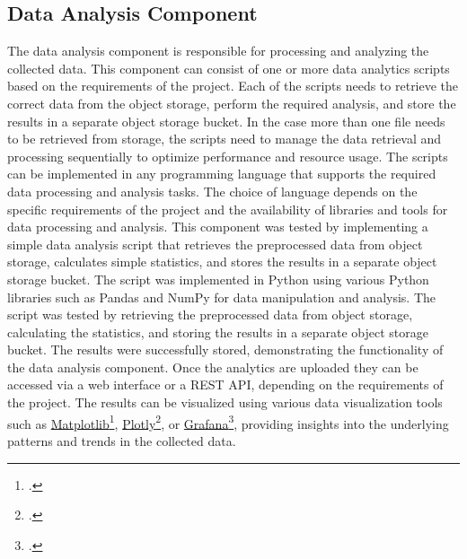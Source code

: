 \subsection{Data Analysis Component}
The data analysis component is responsible for processing and analyzing the collected data. This component can consist of one or more data analytics scripts based on the requirements of the project. Each of the scripts needs to retrieve the correct data from the object storage, perform the required analysis, and store the results in a separate object storage bucket. In the case more than one file needs to be retrieved from storage, the scripts need to manage the data retrieval and processing sequentially to optimize performance and resource usage. The scripts can be implemented in any programming language that supports the required data processing and analysis tasks. The choice of language depends on the specific requirements of the project and the availability of libraries and tools for data processing and analysis.
This component was tested by implementing  a simple data analysis script that retrieves the preprocessed data from object storage, calculates simple statistics, and stores the results in a separate object storage bucket. The script was implemented in Python using various Python libraries such as Pandas and NumPy for data manipulation and analysis. The script was tested by retrieving the preprocessed data from object storage, calculating the statistics, and storing the results in a separate object storage bucket. The results were successfully stored, demonstrating the functionality of the data analysis component.
Once the analytics are uploaded they can be accessed via a web interface or a REST API, depending on the requirements of the project. The results can be visualized using various data visualization tools such as \href{https://matplotlib.org/}{Matplotlib}\footcite{site:matplot}, \href{https://plotly.com/}{Plotly}\footcite{site:plotly}, or \href{https://grafana.com/}{Grafana}\footcite{site:grafana}, providing insights into the underlying patterns and trends in the collected data.
